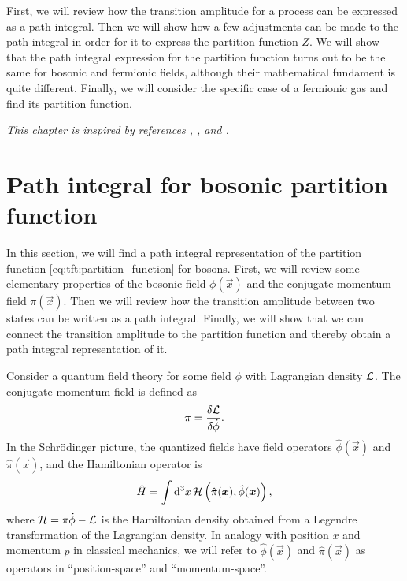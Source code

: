 First, we will review how the transition amplitude for a process can be expressed as a path integral.
Then we will show how a few adjustments can be made to the path integral in order for it to express the partition function $Z$.
We will show that the path integral expression for the partition function turns out to be the same for bosonic and fermionic fields, although their mathematical fundament is quite different.
Finally, we will consider the specific case of a fermionic gas and find its partition function.

\textit{This chapter is inspired by references \cite{ref:kapusta}, \cite{ref:altland_simons}, \cite{ref:tft_basics} and \cite{ref:tft_random_note_1}.}

\section{Path integral for bosonic partition function}
\label{sec:tft:path_integral_boson}


In this section, we will find a path integral representation of the partition function \eqref{eq:tft:partition_function} for bosons.
First, we will review some elementary properties of the bosonic field $\phi(\vec{x})$ and the conjugate momentum field $\pi(\vec{x})$.
Then we will review how the transition amplitude between two states can be written as a path integral.
Finally, we will show that we can connect the transition amplitude to the partition function and thereby obtain a path integral representation of it.

Consider a quantum field theory for some field $\phi$ with Lagrangian density $\mathcal{L}$.
The conjugate momentum field is defined as
\begin{equation}
	\pi = \fdv{\lagr}{\dot\phi} .
\label{eq:tft:conjugate_mometum_definition}
\end{equation}
In the Schrödinger picture, the quantized fields have field operators $\hat{\phi}(\vec{x})$ and $\hat{\pi}(\vec{x})$, and the Hamiltonian operator is
\begin{equation}
	\hat{H} = \int \mathop{}\!\mathrm{d}^3 x \, \mathcal{H} \left( \hat{\pi}({\bm{x}}), \hat{\phi}({\bm{x}}) \right) ,
\end{equation}
where $\mathcal{H} = \pi \dot\phi - \mathcal{L}$ is the Hamiltonian density obtained from a Legendre transformation of the Lagrangian density.
In analogy with position $x$ and momentum $p$ in classical mechanics, we will refer to $\hat\phi(\vec{x})$ and $\hat\pi(\vec{x})$ as operators in ``position-space'' and ``momentum-space''.

